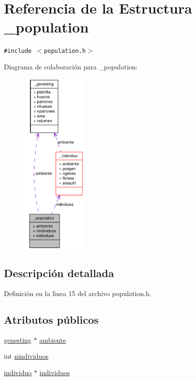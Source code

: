 \hypertarget{struct__population}{
\section{Referencia de la Estructura \_\-population}
\label{struct__population}
}
{\tt \#include $<$population.h$>$}

Diagrama de colaboraci\'{o}n para \_\-population:\begin{figure}[H]
\begin{center}
\leavevmode
\includegraphics[width=94pt]{struct__population__coll__graph}
\end{center}
\end{figure}


\subsection{Descripci\'{o}n detallada}




Definici\'{o}n en la l\'{\i}nea 15 del archivo population.h.\subsection*{Atributos p\'{u}blicos}
\begin{CompactItemize}
\item 
\hyperlink{struct__genesting}{genesting} $\ast$ \hyperlink{struct__population_68ccc9819f5face92f988074d5b1a8af_68ccc9819f5face92f988074d5b1a8af}{ambiente}
\item 
int \hyperlink{struct__population_6dc56f2e17990f5e0ae27324e27f948e_6dc56f2e17990f5e0ae27324e27f948e}{nindividuos}
\item 
\hyperlink{struct__individuo}{individuo} $\ast$ \hyperlink{struct__population_3c05b6054f79c3c7993559e3148752a9_3c05b6054f79c3c7993559e3148752a9}{individuos}
\end{CompactItemize}


